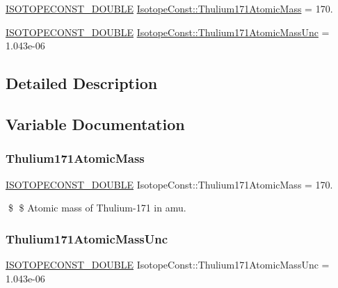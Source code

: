 \begin{DoxyCompactItemize}
\item 
\mbox{\hyperlink{group___isotope_const-_macros_ga8f45a7272ce02c0b4c65c44636ed719a}{I\+S\+O\+T\+O\+P\+E\+C\+O\+N\+S\+T\+\_\+\+D\+O\+U\+B\+LE}} \mbox{\hyperlink{group___isotope_const-_thulium-_tm171_ga13ba26ff91fe1d3464b05fde6787f09f}{Isotope\+Const\+::\+Thulium171\+Atomic\+Mass}} = 170.
\item 
\mbox{\hyperlink{group___isotope_const-_macros_ga8f45a7272ce02c0b4c65c44636ed719a}{I\+S\+O\+T\+O\+P\+E\+C\+O\+N\+S\+T\+\_\+\+D\+O\+U\+B\+LE}} \mbox{\hyperlink{group___isotope_const-_thulium-_tm171_gae358a5c39571fce01f7d0062bd1ca834}{Isotope\+Const\+::\+Thulium171\+Atomic\+Mass\+Unc}} = 1.\+043e-\/06
\end{DoxyCompactItemize}


\subsection{Detailed Description}


\subsection{Variable Documentation}
\mbox{\label{group___isotope_const-_thulium-_tm171_ga13ba26ff91fe1d3464b05fde6787f09f}} 
\subsubsection{\texorpdfstring{Thulium171\+Atomic\+Mass}{Thulium171AtomicMass}}
{\footnotesize\ttfamily \mbox{\hyperlink{group___isotope_const-_macros_ga8f45a7272ce02c0b4c65c44636ed719a}{I\+S\+O\+T\+O\+P\+E\+C\+O\+N\+S\+T\+\_\+\+D\+O\+U\+B\+LE}} Isotope\+Const\+::\+Thulium171\+Atomic\+Mass = 170.}

\$ \$ Atomic mass of Thulium-\/171 in amu. \mbox{\label{group___isotope_const-_thulium-_tm171_gae358a5c39571fce01f7d0062bd1ca834}} 
\subsubsection{\texorpdfstring{Thulium171\+Atomic\+Mass\+Unc}{Thulium171AtomicMassUnc}}
{\footnotesize\ttfamily \mbox{\hyperlink{group___isotope_const-_macros_ga8f45a7272ce02c0b4c65c44636ed719a}{I\+S\+O\+T\+O\+P\+E\+C\+O\+N\+S\+T\+\_\+\+D\+O\+U\+B\+LE}} Isotope\+Const\+::\+Thulium171\+Atomic\+Mass\+Unc = 1.\+043e-\/06}

